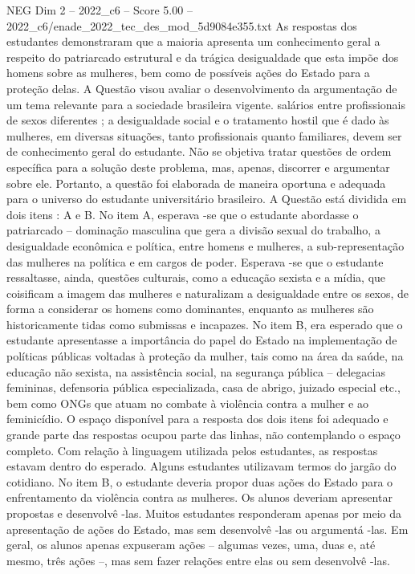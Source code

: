 \begin{textsample}{NEG Dim 2 – 2022\_c6 – Score 5.00 – 2022\_c6/enade\_2022\_tec\_des\_mod\_5d9084e355.txt}
As respostas dos estudantes demonstraram que a maioria apresenta um conhecimento geral a respeito do patriarcado estrutural e da trágica desigualdade que esta impõe dos homens sobre as mulheres, bem como de possíveis ações do Estado para a proteção delas.
A Questão visou avaliar o desenvolvimento da argumentação de um tema relevante para a sociedade brasileira vigente. salários entre profissionais de sexos diferentes ; a desigualdade social e o tratamento hostil que é dado às mulheres, em diversas situações, tanto profissionais quanto familiares, devem ser de conhecimento geral do estudante.
Não se objetiva tratar questões de ordem específica para a solução deste problema, mas, apenas, discorrer e argumentar sobre ele.
Portanto, a questão foi elaborada de maneira oportuna e adequada para o universo do estudante universitário brasileiro.
A Questão está dividida em dois itens : A e B.
No item A, esperava -se que o estudante abordasse o patriarcado – dominação masculina que gera a divisão sexual do trabalho, a desigualdade econômica e política, entre homens e mulheres, a sub-representação das mulheres na política e em cargos de poder.
Esperava -se que o estudante ressaltasse, ainda, questões culturais, como a educação sexista e a mídia, que coisificam a imagem das mulheres e naturalizam a desigualdade entre os sexos, de forma a considerar os homens como dominantes, enquanto as mulheres são historicamente tidas como submissas e incapazes.
No item B, era esperado que o estudante apresentasse a importância do papel do Estado na implementação de políticas públicas voltadas à proteção da mulher, tais como na área da saúde, na educação não sexista, na assistência social, na segurança pública – delegacias femininas, defensoria pública especializada, casa de abrigo, juizado especial etc., bem como ONGs que atuam no combate à violência contra a mulher e ao feminicídio.
O espaço disponível para a resposta dos dois itens foi adequado e grande parte das respostas ocupou parte das linhas, não contemplando o espaço completo.
Com relação à linguagem utilizada pelos estudantes, as respostas estavam dentro do esperado.
Alguns estudantes utilizavam termos do jargão do cotidiano.
No item B, o estudante deveria propor duas ações do Estado para o enfrentamento da violência contra as mulheres.
Os alunos deveriam apresentar propostas e desenvolvê -las.
Muitos estudantes responderam apenas por meio da apresentação de ações do Estado, mas sem desenvolvê -las ou argumentá -las.
Em geral, os alunos apenas expuseram ações – algumas vezes, uma, duas e, até mesmo, três ações –, mas sem fazer relações entre elas ou sem desenvolvê -las.

\end{textsample}
